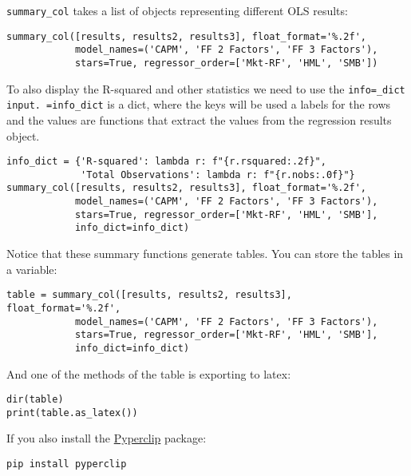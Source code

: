 \documentclass[12pt, a4paper]{article}
\begin{document}
\texttt{summary\_col} takes a list of objects representing different OLS results:
\lstset{language=jupyter-python,label= ,caption= ,captionpos=b,numbers=none}
\begin{lstlisting}
summary_col([results, results2, results3], float_format='%.2f',
            model_names=('CAPM', 'FF 2 Factors', 'FF 3 Factors'),
            stars=True, regressor_order=['Mkt-RF', 'HML', 'SMB'])
\end{lstlisting}

To also display the R-squared and other statistics we need to use the \texttt{info=\_dict input.
=info\_dict} is a dict, where the keys will be used a labels for the rows and the values are functions that extract the values from the regression results object.
\lstset{language=jupyter-python,label= ,caption= ,captionpos=b,numbers=none}
\begin{lstlisting}
info_dict = {'R-squared': lambda r: f"{r.rsquared:.2f}",
             'Total Observations': lambda r: f"{r.nobs:.0f}"}
summary_col([results, results2, results3], float_format='%.2f',
            model_names=('CAPM', 'FF 2 Factors', 'FF 3 Factors'),
            stars=True, regressor_order=['Mkt-RF', 'HML', 'SMB'],
            info_dict=info_dict)
\end{lstlisting}

Notice that these summary functions generate tables.
You can store the tables in a variable:
\lstset{language=jupyter-python,label= ,caption= ,captionpos=b,numbers=none}
\begin{lstlisting}
table = summary_col([results, results2, results3], float_format='%.2f',
            model_names=('CAPM', 'FF 2 Factors', 'FF 3 Factors'),
            stars=True, regressor_order=['Mkt-RF', 'HML', 'SMB'],
            info_dict=info_dict)
\end{lstlisting}

And one of the methods of the table is exporting to latex:
\lstset{language=jupyter-python,label= ,caption= ,captionpos=b,numbers=none}
\begin{lstlisting}
dir(table)
print(table.as_latex())
\end{lstlisting}

If you also install the \href{https://github.com/asweigart/pyperclip}{Pyperclip} package:
\lstset{language=bash,label= ,caption= ,captionpos=b,firstnumber=1,numbers=left,style=bash}
\begin{lstlisting}
pip install pyperclip
\end{lstlisting}
\end{document}
